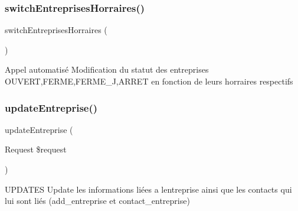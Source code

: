 \subsubsection{\texorpdfstring{switch\+Entreprises\+Horraires()}{switchEntreprisesHorraires()}}
{\footnotesize\ttfamily switch\+Entreprises\+Horraires (\begin{DoxyParamCaption}{ }\end{DoxyParamCaption})}

Appel automatisé Modification du statut des entreprises \textquotesingle{}O\+U\+V\+E\+RT\textquotesingle{},\textquotesingle{}F\+E\+R\+ME\textquotesingle{},\textquotesingle{}F\+E\+R\+M\+E\+\_\+J\textquotesingle{},\textquotesingle{}A\+R\+R\+ET\textquotesingle{} en fonction de leurs horraires respectifs \mbox{\label{class_app_1_1_http_1_1_controllers_1_1_entreprise_informations_controller_a4203ff113dc58ab01a32c1abb4254bec}} 
\subsubsection{\texorpdfstring{update\+Entreprise()}{updateEntreprise()}}
{\footnotesize\ttfamily update\+Entreprise (\begin{DoxyParamCaption}\item[{Request}]{\$request }\end{DoxyParamCaption})}

U\+P\+D\+A\+T\+ES Update les informations liées a l\textquotesingle{}entreprise ainsi que les contacts qui lui sont liés (add\+\_\+entreprise et contact\+\_\+entreprise)


